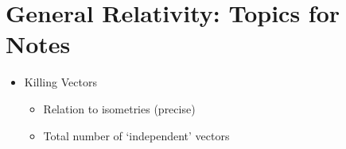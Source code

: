 \documentclass[12pt]{article}
\begin{document}
\section*{General Relativity: Topics for Notes}

	\begin{itemize}
	
	
		\item Killing Vectors
			\begin{itemize}
			
				\item Relation to isometries (precise)
				
				\item Total number of `independent' vectors
				
			\end{itemize}
	
	
	\end{itemize}
\end{document}
